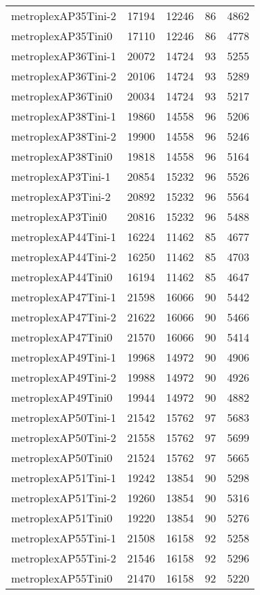 \begin{longtable}{lrrrr}
metroplexAP35Tini-2 & 17194 & 12246 & 86 & 4862 \\
metroplexAP35Tini0 & 17110 & 12246 & 86 & 4778 \\
metroplexAP36Tini-1 & 20072 & 14724 & 93 & 5255 \\
metroplexAP36Tini-2 & 20106 & 14724 & 93 & 5289 \\
metroplexAP36Tini0 & 20034 & 14724 & 93 & 5217 \\
metroplexAP38Tini-1 & 19860 & 14558 & 96 & 5206 \\
metroplexAP38Tini-2 & 19900 & 14558 & 96 & 5246 \\
metroplexAP38Tini0 & 19818 & 14558 & 96 & 5164 \\
metroplexAP3Tini-1 & 20854 & 15232 & 96 & 5526 \\
metroplexAP3Tini-2 & 20892 & 15232 & 96 & 5564 \\
metroplexAP3Tini0 & 20816 & 15232 & 96 & 5488 \\
metroplexAP44Tini-1 & 16224 & 11462 & 85 & 4677 \\
metroplexAP44Tini-2 & 16250 & 11462 & 85 & 4703 \\
metroplexAP44Tini0 & 16194 & 11462 & 85 & 4647 \\
metroplexAP47Tini-1 & 21598 & 16066 & 90 & 5442 \\
metroplexAP47Tini-2 & 21622 & 16066 & 90 & 5466 \\
metroplexAP47Tini0 & 21570 & 16066 & 90 & 5414 \\
metroplexAP49Tini-1 & 19968 & 14972 & 90 & 4906 \\
metroplexAP49Tini-2 & 19988 & 14972 & 90 & 4926 \\
metroplexAP49Tini0 & 19944 & 14972 & 90 & 4882 \\
metroplexAP50Tini-1 & 21542 & 15762 & 97 & 5683 \\
metroplexAP50Tini-2 & 21558 & 15762 & 97 & 5699 \\
metroplexAP50Tini0 & 21524 & 15762 & 97 & 5665 \\
metroplexAP51Tini-1 & 19242 & 13854 & 90 & 5298 \\
metroplexAP51Tini-2 & 19260 & 13854 & 90 & 5316 \\
metroplexAP51Tini0 & 19220 & 13854 & 90 & 5276 \\
metroplexAP55Tini-1 & 21508 & 16158 & 92 & 5258 \\
metroplexAP55Tini-2 & 21546 & 16158 & 92 & 5296 \\
metroplexAP55Tini0 & 21470 & 16158 & 92 & 5220 \\

\end{longtable}
